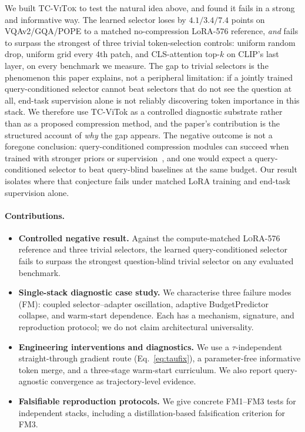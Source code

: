 \documentclass[runningheads]{llncs}
\begin{document}
We built \textsc{TC-ViTok} to test the natural idea above, and found
it fails in a strong and informative way. The learned selector loses
by $4.1/3.4/7.4$ points on VQAv2/GQA/POPE to a matched no-compression
LoRA-576 reference, \emph{and} fails to surpass the strongest of three
trivial token-selection controls: uniform random drop, uniform grid
every $4$th patch, and CLS-attention top-$k$ on CLIP's last layer,
on every benchmark we measure. The gap to trivial selectors is the
phenomenon this paper explains, not a peripheral limitation: if a
jointly trained query-conditioned selector cannot beat selectors that
do not see the question at all, end-task supervision alone is not
reliably discovering token importance in this stack. We therefore use
TC-ViTok as a controlled diagnostic substrate rather than as a
proposed compression method, and the paper's contribution is the
structured account of \emph{why} the gap appears.
The negative outcome is not a foregone conclusion: query-conditioned
compression modules can succeed when trained with stronger priors or
supervision~\cite{li2023blip2,zhang2025sparsevlm,li2025qgvtc}, and
one would expect a query-conditioned selector to beat query-blind
baselines at the same budget. Our result isolates where that
conjecture fails under matched LoRA training and end-task supervision
alone.

\paragraph{Contributions.}
\begin{itemize}
\setlength{\itemsep}{0pt}
\setlength{\parsep}{0pt}
\setlength{\topsep}{2pt}
\item \textbf{Controlled negative result.} Against the compute-matched
\textsc{LoRA-576} reference and three trivial selectors, the
learned query-conditioned selector fails to surpass the strongest
question-blind trivial selector on any evaluated benchmark.
\item \textbf{Single-stack diagnostic case study.} We characterise
three failure modes (FM): coupled selector--adapter oscillation,
adaptive BudgetPredictor collapse, and warm-start dependence. Each has a
mechanism, signature, and reproduction protocol; we do not claim
architectural universality.
\item \textbf{Engineering interventions and diagnostics.} We use a
$\tau$-independent straight-through gradient route (Eq.~\ref{eq:taufix}),
a parameter-free informative token merge, and a three-stage warm-start
curriculum. We also report query-agnostic convergence as
trajectory-level evidence.
\item \textbf{Falsifiable reproduction protocols.} We give concrete
FM1--FM3 tests for independent stacks, including a distillation-based
falsification criterion for FM3.
\end{itemize}
\end{document}
